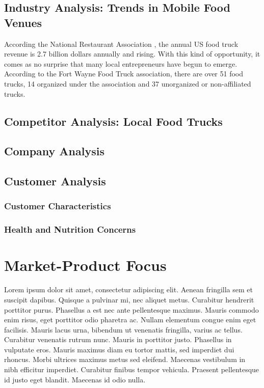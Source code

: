 \documentclass[12pt, letterpaper]{article}
\begin{document}
\subsection{Industry Analysis: Trends in Mobile Food Venues}
According the National Restaurant Association , the annual US food truck revenue is 2.7 billion dollars annually and rising. \cite{ibis1} With this kind of opportunity, it comes as no surprise
that many local entrepreneurs have begun to emerge. According to the Fort Wayne Food Truck association, there are over 51 food trucks, 14 organized under the association and 37 unorganized or non-affiliated trucks. \cite{fwfta}
\subsection{Competitor Analysis: Local Food Trucks}

\subsection{Company Analysis}
\subsection{Customer Analysis}
\subsubsection{Customer Characteristics}
\subsubsection{Health and Nutrition Concerns}

\section{Market-Product Focus}
Lorem ipsum dolor sit amet, consectetur adipiscing elit. Aenean fringilla sem et suscipit dapibus. Quisque a pulvinar mi, nec aliquet metus. Curabitur hendrerit porttitor purus. Phasellus a est nec ante pellentesque maximus. Mauris commodo enim risus, eget porttitor odio pharetra ac. Nullam elementum congue enim eget facilisis. Mauris lacus urna, bibendum ut venenatis fringilla, varius ac tellus. Curabitur venenatis rutrum nunc. Mauris in porttitor justo. Phasellus in vulputate eros. Mauris maximus diam eu tortor mattis, sed imperdiet dui rhoncus. Morbi ultrices maximus metus sed eleifend. Maecenas vestibulum in nibh efficitur imperdiet. Curabitur finibus tempor vehicula. Praesent pellentesque id justo eget blandit. Maecenas id odio nulla.
\end{document}
